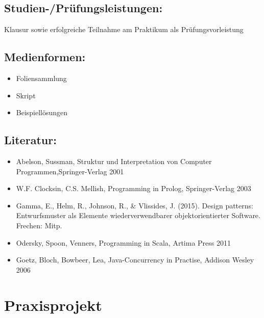 \section*{Studien-/Prüfungsleistungen:}\label{studien-pruxfcfungsleistungen-15}

Klausur sowie erfolgreiche Teilnahme am Praktikum als
Prüfungsvorleistung

\section*{Medienformen:}\label{medienformen-10}

\begin{itemize}
\item
  Foliensammlung
\item
  Skript
\item
  Beispiellösungen
\end{itemize}

\section*{Literatur:}\label{literatur-14}

\begin{itemize}
\item
  Abelson, Sussman, Struktur und Interpretation von Computer
  Programmen,Springer-Verlag 2001
\item
  W.F. Clocksin, C.S. Mellish, Programming in Prolog, Springer-Verlag
  2003
\item
  Gamma, E., Helm, R., Johnson, R., \& Vlissides, J. (2015). Design
  patterns: Entwurfsmuster als Elemente wiederverwendbarer
  objektorientierter Software. Frechen: Mitp.
\item
  Odersky, Spoon, Venners, Programming in Scala, Artima Press 2011
\item
  Goetz, Bloch, Bowbeer, Lea, Java-Concurrency in Practise, Addison
  Wesley 2006
\end{itemize}

\chapter{Praxisprojekt}\label{praxisprojekt}


